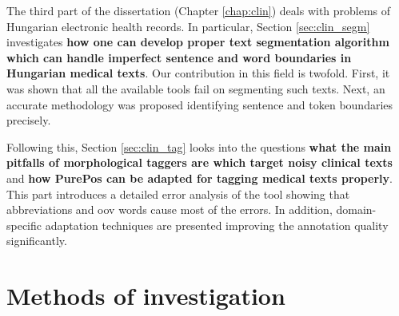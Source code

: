 The third part of the dissertation (Chapter \ref{chap:clin}) deals with problems of Hungarian electronic health records.
In particular, Section \ref{sec:clin_segm} investigates \textbf{how one can develop proper text segmentation algorithm which can handle imperfect sentence and word boundaries in Hungarian medical texts}. 
Our contribution in this field is twofold. 
First, it was shown that all the available tools fail on segmenting such texts.
Next, an accurate methodology was proposed identifying sentence and token boundaries precisely.

Following this, Section \ref{sec:clin_tag} looks into the questions \textbf{what the main pitfalls of morphological taggers are which target noisy clinical texts} and \textbf{how PurePos can be adapted for tagging medical texts properly}.
This part introduces a detailed error analysis of the tool showing that abbreviations and \gls{oov} words cause most of the errors.
In addition, domain-specific adaptation techniques are presented improving the annotation quality significantly.



\section{Methods of investigation}

